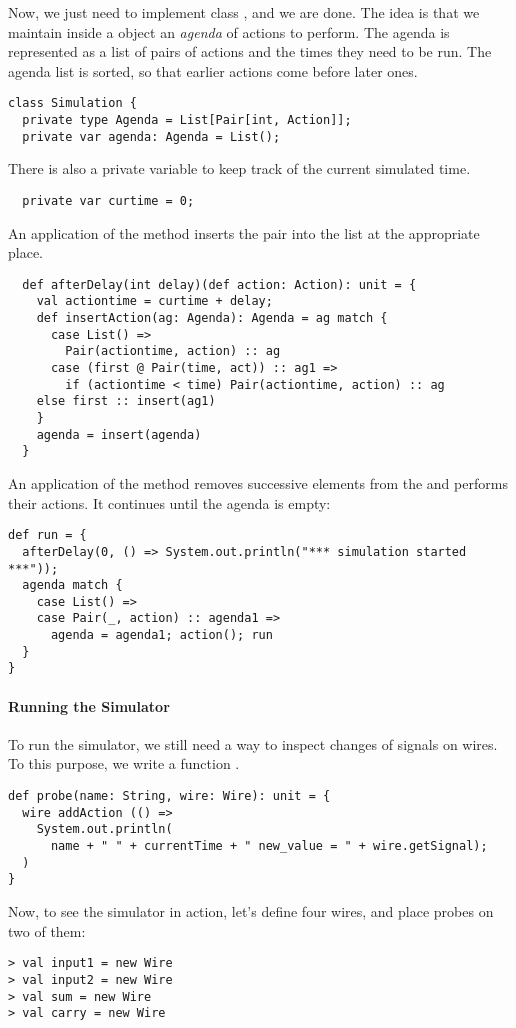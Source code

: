 \documentclass[a4paper,12pt,twoside,titlepage]{book}
\begin{document}
{Now, we just need to implement class , and we are
done.  The idea is that we maintain inside a  object
an \emph{agenda} of actions to perform.  The agenda is represented as
a list of pairs of actions and the times they need to be run.  The
agenda list is sorted, so that earlier actions come before later ones.
\begin{lstlisting} 
class Simulation {
  private type Agenda = List[Pair[int, Action]];
  private var agenda: Agenda = List();
\end{lstlisting}
There is also a private variable  to keep track of the
current simulated time.
\begin{lstlisting}
  private var curtime = 0;
\end{lstlisting}
An application of the method  
inserts the pair  into the
 list at the appropriate place.
\begin{lstlisting}
  def afterDelay(int delay)(def action: Action): unit = {
    val actiontime = curtime + delay;
    def insertAction(ag: Agenda): Agenda = ag match {
      case List() => 
        Pair(actiontime, action) :: ag
      case (first @ Pair(time, act)) :: ag1 =>
        if (actiontime < time) Pair(actiontime, action) :: ag
	else first :: insert(ag1)
    }
    agenda = insert(agenda)
  }
\end{lstlisting}
An application of the  method removes successive elements
from the  and performs their actions.
It continues until the agenda is empty:
\begin{lstlisting}
def run = {
  afterDelay(0, () => System.out.println("*** simulation started ***"));
  agenda match {
    case List() =>
    case Pair(_, action) :: agenda1 =>
      agenda = agenda1; action(); run
  }
}
\end{lstlisting}


\paragraph{Running the Simulator}
To run the simulator, we still need a way to inspect changes of
signals on wires. To this purpose, we write a function .
\begin{lstlisting}
def probe(name: String, wire: Wire): unit = {
  wire addAction (() =>
    System.out.println(
      name + " " + currentTime + " new_value = " + wire.getSignal);
  )
}
\end{lstlisting}
Now, to see the simulator in action, let's define four wires, and place
probes on two of them: 
\begin{lstlisting}
> val input1 = new Wire
> val input2 = new Wire
> val sum = new Wire
> val carry = new Wire


\end{lstlisting}}
\end{document}
